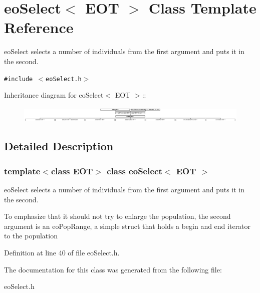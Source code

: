 \section{eo\-Select$<$ EOT $>$ Class Template Reference}
\label{classeo_select}
eo\-Select selects a number of individuals from the first argument and puts it in the second.  


{\tt \#include $<$eo\-Select.h$>$}

Inheritance diagram for eo\-Select$<$ EOT $>$::\begin{figure}[H]
\begin{center}
\leavevmode
\includegraphics[height=0.786241cm]{classeo_select}
\end{center}
\end{figure}


\subsection{Detailed Description}
\subsubsection*{template$<$class EOT$>$ class eo\-Select$<$ EOT $>$}

eo\-Select selects a number of individuals from the first argument and puts it in the second. 

To emphasize that it should not try to enlarge the population, the second argument is an eo\-Pop\-Range, a simple struct that holds a begin and end iterator to the population 



Definition at line 40 of file eo\-Select.h.

The documentation for this class was generated from the following file:\begin{CompactItemize}
\item 
eo\-Select.h\end{CompactItemize}
